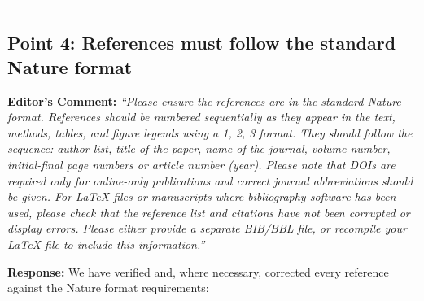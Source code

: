 \documentclass[11pt,a4paper]{article}
\begin{document}
\vspace{1.5em}
\hrule
\vspace{1.5em}

\subsection*{Point 4: References must follow the standard Nature format}

\vspace{0.5em}
\noindent\textbf{Editor's Comment:}
\textit{``Please ensure the references are in the standard Nature format. References should be numbered sequentially as they appear in the text, methods, tables, and figure legends using a 1, 2, 3 format. They should follow the sequence: author list, title of the paper, name of the journal, volume number, initial-final page numbers or article number (year). Please note that DOIs are required only for online-only publications and correct journal abbreviations should be given. For LaTeX files or manuscripts where bibliography software has been used, please check that the reference list and citations have not been corrupted or display errors. Please either provide a separate BIB/BBL file, or recompile your LaTeX file to include this information.''}

\vspace{0.5em}
\noindent\textbf{Response:}
We have verified and, where necessary, corrected every reference against the Nature format requirements:
\end{document}
